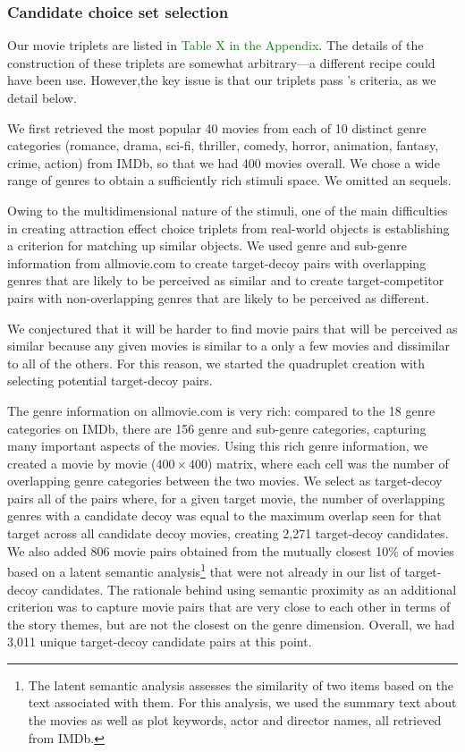 \documentclass[12pt, a4paper]{article}
\newcommand{\NS}[1] {{\textcolor{green}{#1}}}
\begin{document}
\subsubsection{Candidate choice set selection}

Our movie triplets are listed in \NS{Table X in the Appendix}. The details of the construction of these triplets are somewhat arbitrary---a different recipe could have been use. However,the key issue is that our triplets pass \citeauthor{Huber2014}'s \citeyear{Huber2014} criteria, as we detail below.

We first retrieved the most popular 40 movies from each of 10 distinct genre categories (romance, drama, sci-fi, thriller, comedy, horror, animation, fantasy, crime, action) from IMDb, so that we had 400 movies overall. We chose a wide range of genres to obtain a sufficiently rich stimuli space. We omitted an sequels.

Owing to the multidimensional nature of the stimuli, one of the main difficulties in creating attraction effect choice triplets from real-world objects is establishing a criterion for matching up similar objects. We used genre and sub-genre information from allmovie.com to create target-decoy pairs with overlapping genres that are likely to be perceived as similar and to create target-competitor pairs with non-overlapping genres that are likely to be perceived as different.

We conjectured that it will be harder to find movie pairs that will be perceived as similar because any given movies is similar to a only a few movies and dissimilar to all of the others. For this reason, we started the quadruplet creation with selecting potential target-decoy pairs.

The genre information on allmovie.com is very rich: compared to the 18 genre categories on IMDb, there are 156 genre and sub-genre categories, capturing many important aspects of the movies. Using this rich genre information, we created a movie by movie ($400 \times 400$) matrix, where each cell was the number of overlapping genre categories between the two movies. We select as target-decoy pairs all of the pairs where, for a given target movie, the number of overlapping genres with a candidate decoy was equal to the maximum overlap seen for that target across all candidate decoy movies, creating 2,271 target-decoy candidates.
We also added 806 movie pairs obtained from the mutually closest 10\% of movies based on a latent semantic analysis\footnote{The latent semantic analysis assesses the similarity of two items based on the text associated with them. For this analysis, we used the summary text about the movies as well as plot keywords, actor and director names, all retrieved from IMDb.} that were not already in our list of target-decoy candidates. The rationale behind using semantic proximity as an additional criterion was to capture movie pairs that are very close to each other in terms of the story themes, but are not the closest on the genre dimension. Overall, we had 3,011 unique target-decoy candidate pairs at this point.
\end{document}
